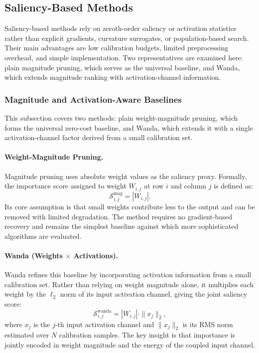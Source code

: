 \subsection{Saliency-Based Methods}

Saliency-based methods rely on zeroth-order saliency or activation statistics rather than explicit gradients, curvature surrogates, or population-based search. Their main advantages are low calibration budgets, limited preprocessing overhead, and simple implementation. Two representatives are examined here: plain magnitude pruning, which serves as the universal baseline, and Wanda, which extends magnitude ranking with activation-channel information.

\subsubsection{Magnitude and Activation-Aware Baselines}

This subsection covers two methods: plain weight-magnitude pruning, which forms the universal zero-cost baseline, and Wanda, which extends it with a single activation-channel factor derived from a small calibration set.

\paragraph{Weight-Magnitude Pruning.}
Magnitude pruning uses absolute weight values as the saliency proxy. Formally, the importance score assigned to weight $W_{i,j}$ at row $i$ and column $j$ is defined as:
\begin{equation}
	\mathcal{S}^{\mathrm{mag}}_{i,j} = |W_{i,j}|.
\end{equation}
Its core assumption is that small weights contribute less to the output and can be removed with limited degradation. The method requires no gradient-based recovery and remains the simplest baseline against which more sophisticated algorithms are evaluated.

\paragraph{Wanda (Weights $\times$ Activations).}
Wanda \cite{sun2023simple} refines this baseline by incorporating activation information from a small calibration set. Rather than relying on weight magnitude alone, it multiplies each weight by the $\ell_2$ norm of its input activation channel, giving the joint saliency score:
\begin{equation}
	\mathcal{S}^{\mathrm{wanda}}_{i,j} = |W_{i,j}| \cdot \|x_j\|_2,
\end{equation}
where $x_j$ is the $j$-th input activation channel and $\|x_j\|_2$ is its RMS norm estimated over $N$ calibration samples. The key insight is that importance is jointly encoded in weight magnitude and the energy of the coupled input channel.

